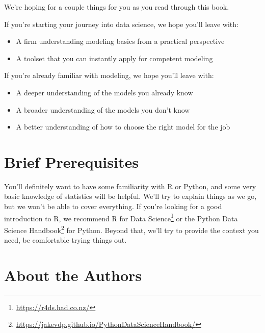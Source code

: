 \documentclass[
  letterpaper,
]{krantz}
\providecommand{\tightlist}{%
  \setlength{\itemsep}{0pt}\setlength{\parskip}{0pt}}\usepackage{longtable,booktabs,array}
\DeclareRobustCommand{\href}[2]{#2\footnote{\url{#1}}}
\begin{document}

We're hoping for a couple things for you as you read through this book.

If you're starting your journey into data science, we hope you'll leave
with:

\begin{itemize}
\tightlist
\item
  A firm understanding modeling basics from a practical perspective
\item
  A toolset that you can instantly apply for competent modeling
\end{itemize}

If you're already familiar with modeling, we hope you'll leave with:

\begin{itemize}
\tightlist
\item
  A deeper understanding of the models you already know
\item
  A broader understanding of the models you don't know
\item
  A better understanding of how to choose the right model for the job
\end{itemize}

\section*{Brief Prerequisites}\label{brief-prerequisites}


You'll definitely want to have some familiarity with R or Python, and
some very basic knowledge of statistics will be helpful. We'll try to
explain things as we go, but we won't be able to cover everything. If
you're looking for a good introduction to R, we recommend
\href{https://r4ds.had.co.nz/}{R for Data Science} or the
\href{https://jakevdp.github.io/PythonDataScienceHandbook/}{Python Data
Science Handbook} for Python. Beyond that, we'll try to provide the
context you need, be comfortable trying things out.

\section*{About the Authors}\label{about-the-authors}

\end{document}
